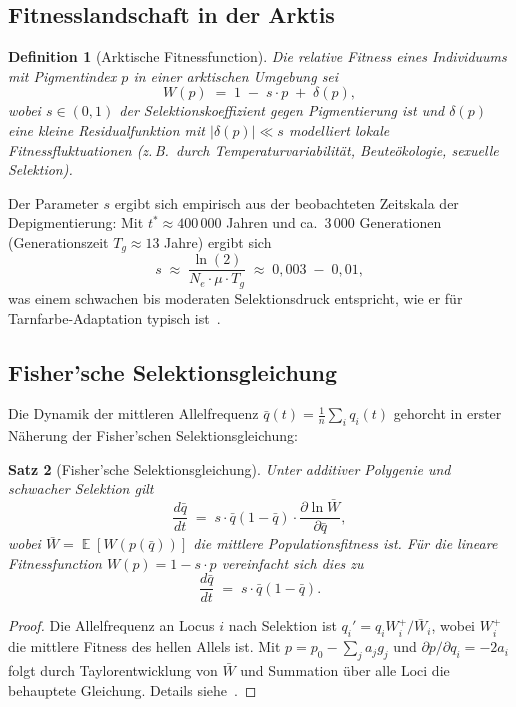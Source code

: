 ﻿\documentclass[12pt,a4paper]{article}
\newtheorem{theorem}{Satz}[section]
\newtheorem{definition}[theorem]{Definition}
\theoremstyle{remark}
\DeclareMathOperator{\E}{\mathbb{E}}
\begin{document}
\subsection{Fitnesslandschaft in der Arktis}

\begin{definition}[Arktische Fitnessfunction]
Die relative Fitness eines Individuums mit Pigmentindex $p$ in einer
arktischen Umgebung sei
\[
  W(p) \;=\; 1 \;-\; s \cdot p \;+\; \delta(p),
\]
wobei $s \in (0,1)$ der Selektionskoeffizient gegen Pigmentierung ist und
$\delta(p)$ eine kleine Residualfunktion mit $|\delta(p)| \ll s$ modelliert
lokale Fitnessfluktuationen (z.\,B.\ durch Temperaturvariabilit\"{a}t,
Beute\"{o}kologie, sexuelle Selektion).
\end{definition}

Der Parameter $s$ ergibt sich empirisch aus der beobachteten Zeitskala der
Depigmentierung: Mit $t^* \approx 400\,000$ Jahren und ca.~$3\,000$
Generationen (Generationszeit $T_g \approx 13$ Jahre) ergibt sich
\[
  s \;\approx\; \frac{\ln(2)}{N_e \cdot \mu \cdot T_g}
    \;\approx\; 0{,}003 \;-\; 0{,}01,
\]
was einem schwachen bis moderaten Selektionsdruck entspricht, wie er f\"{u}r
Tarnfarbe-Adaptation typisch ist~\cite{hoekstra2006}.

\subsection{Fisher'sche Selektionsgleichung}

Die Dynamik der mittleren Allelfrequenz $\bar{q}(t) = \frac{1}{n}\sum_i q_i(t)$
gehorcht in erster N\"{a}herung der Fisher'schen Selektionsgleichung:

\begin{theorem}[Fisher'sche Selektionsgleichung]
\label{thm:fisher}
Unter additiver Polygenie und schwacher Selektion gilt
\[
  \frac{d\bar{q}}{dt} \;=\; s \cdot \bar{q}(1 - \bar{q})
    \cdot \frac{\partial \ln \bar{W}}{\partial \bar{q}},
\]
wobei $\bar{W} = \E[W(p(\bar{q}))]$ die mittlere Populationsfitness ist.
F\"{u}r die lineare Fitnessfunction $W(p) = 1 - s\cdot p$ vereinfacht sich dies zu
\[
  \frac{d\bar{q}}{dt} \;=\; s \cdot \bar{q}(1 - \bar{q}).
\]
\end{theorem}

\begin{proof}
Die Allelfrequenz an Locus $i$ nach Selektion ist
$q_i' = q_i W_i^+ / \bar{W}_i$, wobei $W_i^+$ die mittlere Fitness des
hellen Allels ist. Mit $p = p_0 - \sum_j a_j g_j$ und $\partial p/\partial q_i = -2a_i$ folgt
durch Taylorentwicklung von $\bar{W}$ und Summation \"{u}ber alle Loci die
behauptete Gleichung. Details siehe~\cite{falconer1996}.
\end{proof}
\end{document}
